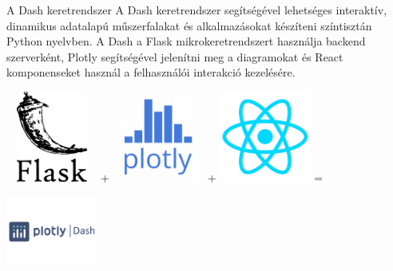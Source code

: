 \documentclass[english, aspectratio=169]{beamer}
\begin{document}
\begin{frame}{A Dash keretrendszer}
A Dash keretrendszer segítségével lehetséges interaktív, dinamikus adatalapú műszerfalakat és alkalmazásokat készíteni színtisztán Python nyelvben. A Dash a Flask mikrokeretrendszert használja backend szerverként, Plotly segítségével jelenítni meg a diagramokat és React komponenseket használ a felhasználói interakció kezelésére.
\begin{center}
\includegraphics[width=3cm, height=3cm, keepaspectratio]{images/dash_1.png} +
\includegraphics[width=3cm, height=3cm, keepaspectratio]{images/dash_2.png} +
\includegraphics[width=3cm, height=3cm, keepaspectratio]{images/dash_3.png} =
\includegraphics[width=3cm, height=3cm, keepaspectratio]{images/dash_4.png}
\end{center}
\end{frame}
\end{document}
